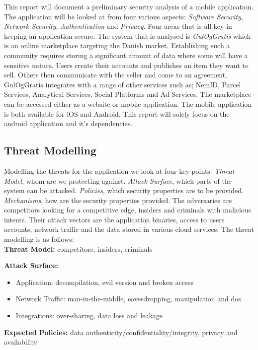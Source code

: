 This report will document a preliminary security analysis of a mobile application. The application will be looked at from four various aspects: \textit{Software Security}, \textit{Network Security}, \textit{Authentication} and \textit{Privacy}. Four areas that is all key in keeping an application secure. The system that is analysed is \textit{GulOgGratis} which is an online marketplace targeting the Danish market. Establishing such a community requires storing a significant amount of data where some will have a sensitive nature. Users create their accounts and publishes an item they want to sell. Others then communicate with the seller and come to an agreement. GulOgGratis integrates with a range of other services such as; NemID, Parcel Services, Analytical Services, Social Platforms and Ad Services. The marketplace can be accessed either as a website or mobile application. The mobile application is both available for iOS and Android. This report will solely focus on the android application and it's dependencies.  

\subsection{Threat Modelling}
 Modelling the threats for the application we look at four key points. \textit{Threat Model},  whom are we protecting against. \textit{Attack Surface}, which parts of the system can be attacked. \textit{Policies}, which security properties are to be provided. \textit{Mechanisms}, how are the security properties provided. The adversaries are competitors looking for a competitive edge, insiders and criminals with malicious intents. Their attack vectors are the application binaries, access to users accounts, network traffic and the data stored in various cloud services. The threat modelling is as follows:\\       


\noindent\textbf{Threat Model:} competitors, insiders, criminals

\noindent\textbf{Attack Surface:}
\begin{itemize}
    \item Application: decompilation, evil version and broken access 
    \item Network Traffic: man-in-the-middle, eavesdropping, manipulation and dos
    \item Integrations: over-sharing, data loss and leakage
\end{itemize}

\noindent\textbf{Expected Policies:} data authenticity/confidentiality/integrity, privacy and availability 


